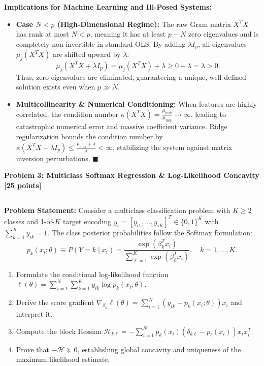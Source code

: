 \documentclass[11pt,a4paper]{article}
\newcommand{\problemheader}[2]{%
  \noindent
  \begin{minipage}{\textwidth}
    {\large\bfseries\textcolor{utblue}{#1}}\hfill
    {\large\bfseries\textcolor{utblue}{#2}}\\[3pt]
    \textcolor{utblue}{\rule{\textwidth}{1pt}}
  \end{minipage}%
  \par\vspace{8pt}
}
\begin{document}
\textbf{Implications for Machine Learning and Ill-Posed Systems:}
\begin{itemize}[itemsep=2pt, leftmargin=18pt]
  \item \textbf{Case $N < p$ (High-Dimensional Regime):} The raw Gram matrix $X^T X$ has rank at most $N < p$, meaning it has at least $p - N$ zero eigenvalues and is completely non-invertible in standard OLS. By adding $\lambda I_p$, all eigenvalues $\mu_j(X^T X)$ are shifted upward by $\lambda$:
  \[
    \mu_j(X^T X + \lambda I_p) = \mu_j(X^T X) + \lambda \ge 0 + \lambda = \lambda > 0.
  \]
  Thus, zero eigenvalues are eliminated, guaranteeing a unique, well-defined solution exists even when $p \gg N$.
  \item \textbf{Multicollinearity \& Numerical Conditioning:} When features are highly correlated, the condition number $\kappa(X^T X) = \frac{\mu_{\max}}{\mu_{\min}} \to \infty$, leading to catastrophic numerical error and massive coefficient variance. Ridge regularization bounds the condition number by $\kappa(X^T X + \lambda I_p) \le \frac{\mu_{\max} + \lambda}{\lambda} < \infty$, stabilizing the system against matrix inversion perturbations. $\blacksquare$
\end{itemize}

\vspace{22pt}

\problemheader{Problem 3: Multiclass Softmax Regression \& Log-Likelihood Concavity}{[25 points]}

\textbf{Problem Statement:}
Consider a multiclass classification problem with $K \ge 2$ classes and 1-of-$K$ target encoding $y_i = [y_{i1}, \dots, y_{iK}]^T \in \{0, 1\}^K$ with $\sum_{k=1}^K y_{ik} = 1$. The class posterior probabilities follow the Softmax formulation:
\[
  p_k(x_i; \theta) \equiv P(Y = k \mid x_i) = \frac{\exp(\beta_k^T x_i)}{\sum_{\ell=1}^K \exp(\beta_\ell^T x_i)}, \quad k = 1, \dots, K.
\]
\begin{enumerate}[label=(\alph*), itemsep=3pt, leftmargin=18pt]
  \item Formulate the conditional log-likelihood function $\ell(\theta) = \sum_{i=1}^N \sum_{k=1}^K y_{ik} \log p_k(x_i; \theta)$.
  \item Derive the score gradient $\nabla_{\beta_k} \ell(\theta) = \sum_{i=1}^N (y_{ik} - p_k(x_i; \theta)) x_i$ and interpret it.
  \item Compute the block Hessian $\mathcal{H}_{k\ell} = -\sum_{i=1}^N p_k(x_i)(\delta_{k\ell} - p_\ell(x_i)) x_i x_i^T$.
  \item Prove that $-\mathcal{H} \succeq 0$, establishing global concavity and uniqueness of the maximum likelihood estimate.
\end{enumerate}
\end{document}
